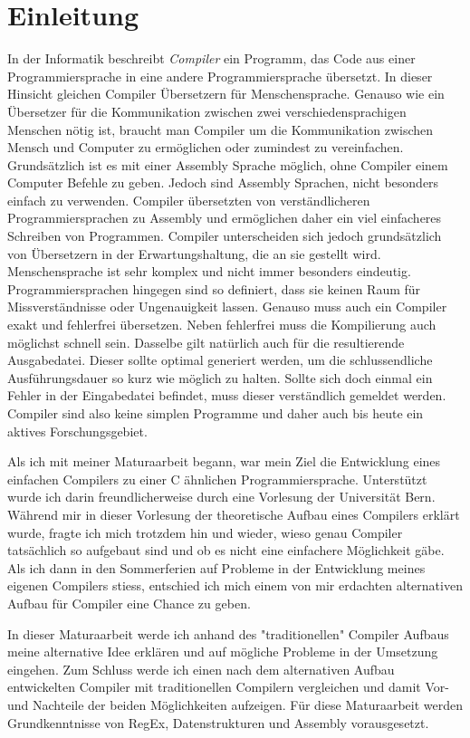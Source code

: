 \chapter{Einleitung}
In der Informatik beschreibt \textit{Compiler} ein Programm, das Code aus einer Programmiersprache in eine andere Programmiersprache übersetzt. In dieser Hinsicht gleichen Compiler Übersetzern für Menschensprache.
Genauso wie ein Übersetzer für die Kommunikation zwischen zwei verschiedensprachigen Menschen nötig ist, braucht man Compiler um die Kommunikation zwischen Mensch und Computer zu ermöglichen oder zumindest zu vereinfachen.
Grundsätzlich ist es mit einer Assembly Sprache möglich, ohne Compiler einem Computer Befehle zu geben. Jedoch sind Assembly Sprachen, nicht besonders einfach zu verwenden.
Compiler übersetzten von verständlicheren Programmiersprachen zu Assembly und ermöglichen daher ein viel einfacheres Schreiben von Programmen.
Compiler unterscheiden sich jedoch grundsätzlich von Übersetzern in der Erwartungshaltung, die an sie gestellt wird. Menschensprache ist sehr komplex und nicht immer besonders eindeutig. 
Programmiersprachen hingegen sind so definiert, dass sie keinen Raum für Missverständnisse oder Ungenauigkeit lassen. Genauso muss auch ein Compiler exakt und fehlerfrei übersetzen.
Neben fehlerfrei muss die Kompilierung auch möglichst schnell sein. Dasselbe gilt natürlich auch für die resultierende Ausgabedatei. Dieser sollte optimal generiert werden, um die schlussendliche
Ausführungsdauer so kurz wie möglich zu halten. Sollte sich doch einmal ein Fehler in der Eingabedatei befindet, muss dieser verständlich gemeldet werden. Compiler sind also keine simplen Programme und daher auch bis heute
ein aktives Forschungsgebiet.

Als ich mit meiner Maturaarbeit begann, war mein Ziel die Entwicklung eines einfachen Compilers zu einer C ähnlichen Programmiersprache. Unterstützt wurde ich darin freundlicherweise durch eine Vorlesung der Universität Bern.
Während mir in dieser Vorlesung der theoretische Aufbau eines Compilers erklärt wurde, fragte ich mich trotzdem hin und wieder, wieso genau Compiler tatsächlich so aufgebaut sind und
ob es nicht eine einfachere Möglichkeit gäbe. Als ich dann in den Sommerferien auf Probleme in der Entwicklung meines eigenen Compilers stiess, entschied ich mich einem von mir erdachten alternativen Aufbau für Compiler eine Chance zu geben. 

In dieser Maturaarbeit werde ich anhand des "traditionellen" Compiler Aufbaus meine alternative Idee erklären und auf mögliche Probleme in der Umsetzung eingehen.
Zum Schluss werde ich einen nach dem alternativen Aufbau entwickelten Compiler mit traditionellen Compilern vergleichen und damit Vor- und Nachteile der beiden Möglichkeiten aufzeigen.
Für diese Maturaarbeit werden Grundkenntnisse von RegEx, Datenstrukturen und Assembly vorausgesetzt.

